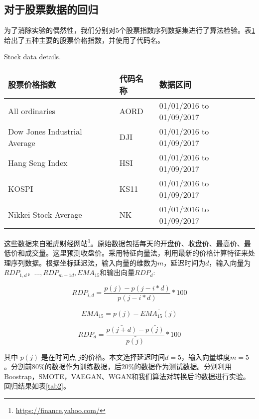 \subsection{对于股票数据的回归}

为了消除实验的偶然性，我们分别对5个股票指数序列数据集进行了算法检验。表\ref{tab1}给出了五种主要的股票价格指数，并使用了代码名。
\begin{table}[htpb]
	\centering
	{Stock data details.}
	\label{tab1}
	\begin{tabular}{lll} \toprule
		股票价格指数   & 代码名称 &  数据区间  \\  \midrule
		All ordinaries   & AORD&  01/01/2016 to 01/09/2017 \\
		Dow Jones Industrial Average   & DJI&01/01/2016 to 01/09/2017\\
		Hang Seng Index   & HSI&   01/01/2016 to 01/09/2017\\
		KOSPI   & KS11& 01/01/2016 to 01/09/2017\\
		Nikkei Stock Average   &NK&   01/01/2016 to 01/09/2017\\
		\bottomrule
	\end{tabular}
\end{table}
这些数据来自雅虎财经网站\footnote{\url{https://finance.yahoo.com/}}。原始数据包括每天的开盘价、收盘价、最高价、最低价和成交量。这里预测收盘价。采用特征向量法\cite{18}，利用最新的价格计算特征来处理序列数据。根据坐标延迟法，输入向量的维数为$m$，延迟时间为$d$，输入向量为$RDP_{1,d}，…,RDP_ {m - 1 d}, EMA_{15}$和输出向量$RDP_ {d} $:

\begin{equation}
\label{eq16}
RDP_{i,d} = \frac{p(j)-p(j-i*d)}{p(j-i*d)}*100
\end{equation}


\begin{equation}
\label{eq17}
EMA_{15}  = p(j)-\bar{EMA_{15}(j)}
\end{equation}

\begin{equation}
\label{eq18}
RDP_{d} = \frac{\bar{p(j+d)}-\bar{p(j)}}{\bar{p(j)}}*100
\end{equation}


其中 $p(j)$ 是在时间点 $j$的价格。本文选择延迟时间$d=5$，输入向量维度$m=5$。分割前$80\% $的数据作为训练数据，后$20\% $的数据作为测试数据。分别利用Boostrap，SMOTE，VAEGAN、WGAN和我们算法对转换后的数据进行实验。回归结果如表\ref{tab2}。

